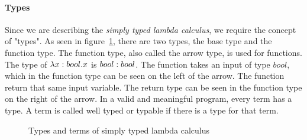 \paragraph{Types}
Since we are describing the \textit{simply typed lambda calculus}, we require the concept of "types". As seen in figure~\ref{fig:types:lambda}, there are two types, the base type and the function type. The function type, also called the arrow type, is used for functions. The type of $\lambda x \mathrel{:} bool . x$ is $bool \mathrel{:} bool$. The function takes an input of type $bool$, which in the function type can be seen on the left of the arrow. The function return that same input variable. The return type can be seen in the function type on the right of the arrow. In a valid and meaningful program, every term has a type. A term is called well typed or typable if there is a type for that term. 
\begin{figure}[H]
\begin{center}
\end{center}
\caption{Types and terms of simply typed lambda calculus}\label{fig:types:lambda}
\end{figure}
